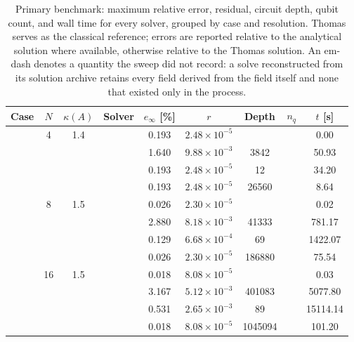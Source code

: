 \begin{table}[htbp]
  \centering
  \caption{Primary benchmark: maximum relative error, residual, circuit depth, qubit count, and wall time for every solver, grouped by case and resolution. Thomas serves as the classical reference; errors are reported relative to the analytical solution where available, otherwise relative to the Thomas solution. An em-dash denotes a quantity the sweep did not record: a solve reconstructed from its solution archive retains every field derived from the field itself and none that existed only in the process.}
  \label{tab:primary_comparison}
  \begin{tabular}{l S[table-format=3.0] S[table-format=4.1] l S[table-format=3.3] S[table-format=1.2e2] S[table-format=6.0] S[table-format=2.0] S[table-format=4.2]}
    \toprule
    {Case} & {$N$} & {$\kappa(A)$} & {Solver} & {$e_\infty$ [\%]} & {$r$} & {Depth} & {$n_q$} & {$t$ [s]} \\
    \midrule
     & 4 & 1.4 &  & 0.193 & $2.48 \times 10^{-5}$ & {\text{---}} & {\text{---}} & 0.00 \\
     &  &  &  & 1.640 & $9.88 \times 10^{-3}$ & 3842 & {\text{---}} & 50.93 \\
     &  &  &  & 0.193 & $2.48 \times 10^{-5}$ & 12 & {\text{---}} & 34.20 \\
     &  &  &  & 0.193 & $2.48 \times 10^{-5}$ & 26560 & {\text{---}} & 8.64 \\
     & 8 & 1.5 &  & 0.026 & $2.30 \times 10^{-5}$ & {\text{---}} & {\text{---}} & 0.02 \\
     &  &  &  & 2.880 & $8.18 \times 10^{-3}$ & 41333 & {\text{---}} & 781.17 \\
     &  &  &  & 0.129 & $6.68 \times 10^{-4}$ & 69 & {\text{---}} & 1422.07 \\
     &  &  &  & 0.026 & $2.30 \times 10^{-5}$ & 186880 & {\text{---}} & 75.54 \\
     & 16 & 1.5 &  & 0.018 & $8.08 \times 10^{-5}$ & {\text{---}} & {\text{---}} & 0.03 \\
     &  &  &  & 3.167 & $5.12 \times 10^{-3}$ & 401083 & {\text{---}} & 5077.80 \\
     &  &  &  & 0.531 & $2.65 \times 10^{-3}$ & 89 & {\text{---}} & 15114.14 \\
     &  &  &  & 0.018 & $8.08 \times 10^{-5}$ & 1045094 & {\text{---}} & 101.20 \\

\end{tabular}
\end{table}
